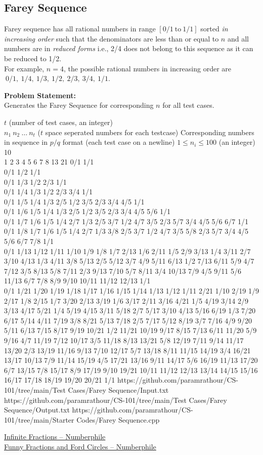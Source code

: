 \subsection{Farey Sequence}
Farey sequence has all rational numbers in range $[0/1\ \text{to}\ 1/1]$ sorted \emph{in increasing order} such that the denominators are less than or equal to $n$ and all numbers are in \emph{reduced forms} i.e., 2/4 does not belong to this sequence as it can be reduced to 1/2.\\
For example, $n=4$, the possible rational numbers in increasing order are $\ 0/1,\ 1/4,\ 1/3,\ 1/2,\ 2/3,\ 3/4,\ 1/1$.

\textbf{Problem Statement:}\\
Generates the Farey Sequence for corresponding $n$ for all test cases.
\begin{testcasesMore}
	{$t$ \hfill(number of test cases, an integer)\\
	$n_1\ n_2\ \ldots\ n_t$ \hfill($t$ space seperated numbers for each testcase)}
	{Corresponding numbers in sequence in $p/q$ format \hfil(each test case on a newline)}
	{$1\leq n_i\leq 100$ \hfill(an integer)}
	{10\\1 2 3 4 5 6 7 8 13 21}
	{0/1 1/1\\0/1 1/2 1/1\\0/1 1/3 1/2 2/3 1/1\\0/1 1/4 1/3 1/2 2/3 3/4 1/1\\0/1 1/5 1/4 1/3 2/5 1/2 3/5 2/3 3/4 4/5 1/1\\0/1 1/6 1/5 1/4 1/3 2/5 1/2 3/5 2/3 3/4 4/5 5/6 1/1\\0/1 1/7 1/6 1/5 1/4 2/7 1/3 2/5 3/7 1/2 4/7 3/5 2/3 5/7 3/4 4/5 5/6 6/7 1/1\\0/1 1/8 1/7 1/6 1/5 1/4 2/7 1/3 3/8 2/5 3/7 1/2 4/7 3/5 5/8 2/3 5/7 3/4 4/5 5/6 6/7 7/8 1/1\\0/1 1/13 1/12 1/11 1/10 1/9 1/8 1/7 2/13 1/6 2/11 1/5 2/9 3/13 1/4 3/11 2/7 3/10 4/13 1/3 4/11 3/8 5/13 2/5 5/12 3/7 4/9 5/11 6/13 1/2 7/13 6/11 5/9 4/7 7/12 3/5 8/13 5/8 7/11 2/3 9/13 7/10 5/7 8/11 3/4 10/13 7/9 4/5 9/11 5/6 11/13 6/7 7/8 8/9 9/10 10/11 11/12 12/13 1/1\\0/1 1/21 1/20 1/19 1/18 1/17 1/16 1/15 1/14 1/13 1/12 1/11 2/21 1/10 2/19 1/9 2/17 1/8 2/15 1/7 3/20 2/13 3/19 1/6 3/17 2/11 3/16 4/21 1/5 4/19 3/14 2/9 3/13 4/17 5/21 1/4 5/19 4/15 3/11 5/18 2/7 5/17 3/10 4/13 5/16 6/19 1/3 7/20 6/17 5/14 4/11 7/19 3/8 8/21 5/13 7/18 2/5 7/17 5/12 8/19 3/7 7/16 4/9 9/20 5/11 6/13 7/15 8/17 9/19 10/21 1/2 11/21 10/19 9/17 8/15 7/13 6/11 11/20 5/9 9/16 4/7 11/19 7/12 10/17 3/5 11/18 8/13 13/21 5/8 12/19 7/11 9/14 11/17 13/20 2/3 13/19 11/16 9/13 7/10 12/17 5/7 13/18 8/11 11/15 14/19 3/4 16/21 13/17 10/13 7/9 11/14 15/19 4/5 17/21 13/16 9/11 14/17 5/6 16/19 11/13 17/20 6/7 13/15 7/8 15/17 8/9 17/19 9/10 19/21 10/11 11/12 12/13 13/14 14/15 15/16 16/17 17/18 18/19 19/20 20/21 1/1}
	{https://github.com/paramrathour/CS-101/tree/main/Test Cases/Farey Sequence/Input.txt}
	{https://github.com/paramrathour/CS-101/tree/main/Test Cases/Farey Sequence/Output.txt}
	{https://github.com/paramrathour/CS-101/tree/main/Starter Codes/Farey Sequence.cpp}
\end{testcasesMore}
\begin{funvideo}
\href{https://youtu.be/DpwUVExX27E}{Infinite Fractions -- Numberphile}\\
\href{https://youtu.be/0hlvhQZIOQw}{Funny Fractions and Ford Circles -- Numberphile}
\end{funvideo}